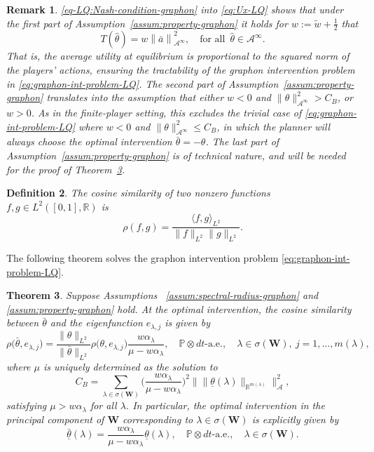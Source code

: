 \documentclass[11pt]{article}
\def\al{\alpha}
\def\P{\mathbb{P}}
\newcommand{\R}{{\mathbb R}}
\newcommand{\be}{\begin{equation}}
\newcommand{\ee}{\end{equation}}
\newtheorem{theorem}{Theorem}[section]
\newtheorem{remark}[theorem]{Remark}
\newtheorem{definition}[theorem]{Definition}
\numberwithin{equation}{section}
\begin{document}
\begin{remark}\label{rem:property-graphon}
\eqref{eq-LQ:Nash-condition-graphon} into \eqref{eq:Ux-LQ} shows that under the first part of Assumption~\ref{assum:property-graphon} it holds for  $w :=\tilde{w}+\frac{1}{2}$ that
$$
T(\hat\theta)=w\left\|\bar{a}\right\|_{\mathcal{A}^\infty}^2,\quad\textrm{for all }\,\hat{\theta}\in\mathcal{A}^\infty.
$$
That is, the average utility at equilibrium is proportional to the squared norm of the players' actions, ensuring the tractability of the graphon intervention problem in \eqref{eq:graphon-int-problem-LQ}. The second part of Assumption~\ref{assum:property-graphon} translates into the assumption that either $w<0$ and $\|\theta\|_{\mathcal{A}^\infty}^2> C_B$, or $w>0$. As in the finite-player setting, this excludes the trivial case of \eqref{eq:graphon-int-problem-LQ} where $w<0$ and $\|\theta\|_{\mathcal{A}^\infty}^2\leq C_B$, in which the planner will always choose the optimal intervention $\bar\theta=-\theta$.  The last part of Assumption~\ref{assum:property-graphon} is of technical nature, and will be needed for the proof of Theorem~\ref{thm:LQ-graphon}.
\end{remark}
\begin{definition}
The cosine similarity of two nonzero functions $f,g\in L^2([0,1],\R) $ is
$$
\rho(f,g) = \frac{\langle f,g\rangle_{L^2}}{\|f\|_{L^2} \|g\|_{L^2}}.
$$
\end{definition}
The following theorem solves the graphon intervention problem \eqref{eq:graphon-int-problem-LQ}.
\begin{theorem}\label{thm:LQ-graphon}
    Suppose Assumptions~ \ref{assum:spectral-radius-graphon} and \ref{assum:property-graphon} hold.
    At the optimal intervention, the cosine similarity between $\bar\theta$ and the eigenfunction $e_{\lambda,j}$ is given by
    \be\label{eq:main-graphon-cosine-similarity-LQ}
    \rho\big(\bar\theta,e_{\lambda,j}\big)
    =\frac{\|\theta\|_{L^2}}{\|\bar\theta\|_{L^2}}\rho\big(\theta,e_{\lambda,j}\big)\frac{w\al_\lambda}{\mu-w\al_\lambda},\quad \P \otimes dt \textrm{-a.e.},\quad \lambda\in\sigma(\boldsymbol{W}),\ j=1,\ldots, m(\lambda),
    \ee
    where $\mu$ is uniquely determined as the solution to
    \be\label{eqshadow-price-graphon-LQ}
    C_B=\sum_{\lambda\in\sigma(\boldsymbol{W})}\big(\frac{w\al_\lambda}{\mu-w\al_\lambda}\big)^2\big\|\|{\underline{\theta}}(\lambda)\|_{\R^{m(\lambda)}}\big\|_{\mathcal{A}}^2,
    \ee
    satisfying $\mu>w\al_\lambda$ for all $\lambda$. In particular, the optimal intervention in the principal component of $\boldsymbol{W}$ corresponding to $\lambda\in\sigma(\boldsymbol{W})$ is explicitly given by 
    \be\label{eq:optimal-zeta-graphon-LQ}
    \bar{\underline{\theta}}(\lambda)=\frac{w\al_\lambda}{\mu-w\al_\lambda}{\underline{\theta}}(\lambda),\quad \P \otimes dt \textrm{-a.e.},\quad \lambda\in\sigma(\boldsymbol{W}).
    \ee
\end{theorem}
\end{document}
